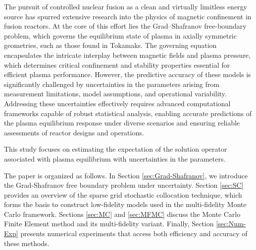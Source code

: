 The pursuit of controlled nuclear fusion as a clean and virtually limitless energy source has spurred extensive research into the physics of magnetic confinement in fusion reactors. At the core of this effort lies the Grad–Shafranov free-boundary problem, which governs the equilibrium state of plasma in axially symmetric geometries, such as those found in Tokamaks. The governing equation encapsulates the intricate interplay between magnetic fields and plasma pressure, which determines critical confinement and stability properties essential for efficient plasma performance. However, the predictive accuracy of these models is significantly challenged by uncertainties in the parameters arising from measurement limitations, model assumptions, and operational variability. Addressing these uncertainties effectively requires advanced computational frameworks capable of robust statistical analysis, enabling accurate predictions of the plasma equilibrium response under diverse scenarios and ensuring reliable assessments of reactor designs and operations.

This study focuses on estimating the expectation of the solution operator associated with plasma equilibrium with uncertainties in the parameters. 






 



 
The paper is organized as follows. In Section \ref{sec:Grad-Shafranov}, we introduce the Grad-Shafranov free boundary problem under uncertainty. Section \ref{sec:SC} provides an overview of the sparse grid stochastic collocation technique, which forms the basis to construct low-fidelity models used in the multi-fidelity Monte Carlo framework. Sections \ref{sec:MC} and \ref{sec:MFMC} discuss the Monte Carlo Finite Element method and its multi-fidelity variant. Finally, Section \ref{sec:Num-Exp} presents numerical experiments that access both efficiency and accuracy of these methods.



